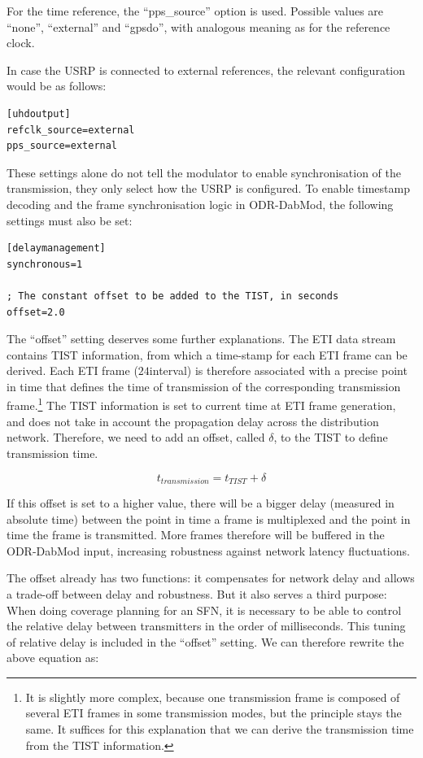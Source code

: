 For the time reference, the ``pps\_source'' option is used. Possible values are
``none'', ``external'' and ``gpsdo'', with analogous meaning as for the
reference clock.

In case the USRP is connected to external references, the relevant configuration
would be as follows:

\begin{lstlisting}
[uhdoutput]
refclk_source=external
pps_source=external
\end{lstlisting}

These settings alone do not tell the modulator to enable synchronisation of the
transmission, they only select how the USRP is configured. To enable timestamp
decoding and the frame synchronisation logic in ODR-DabMod, the following
settings must also be set:

\begin{lstlisting}
[delaymanagement]
synchronous=1

; The constant offset to be added to the TIST, in seconds
offset=2.0
\end{lstlisting}

The ``offset'' setting deserves some further explanations. The ETI data stream
contains TIST information, from which a time-stamp for each ETI frame can be
derived. Each ETI frame ($24$\ms interval) is therefore associated with a
precise point in time that defines the time of transmission of the corresponding
transmission frame.\footnote{It is slightly more complex, because one
    transmission frame is composed of several ETI frames in some
    transmission modes, but the principle stays the same. It suffices for this
    explanation that we can derive the transmission time from the TIST
information.} The TIST information is set to current time at ETI frame
generation, and does not take in account the propagation delay across the
distribution network. Therefore, we need to add an offset, called $\delta$, to
the TIST to define transmission time.

\[
t_{transmission} = t_{TIST} + \delta
\]

If this offset is set to a higher value, there will be a bigger delay (measured
in absolute time) between the point in time a frame is multiplexed and the point
in time the frame is transmitted. More frames therefore will be buffered in
the ODR-DabMod input, increasing robustness against network latency
fluctuations.

The offset already has two functions: it compensates for network delay and
allows a trade-off between delay and robustness. But it also serves a third
purpose: When doing coverage planning for an SFN, it is necessary to be able to
control the relative delay between transmitters in the order of milliseconds.
This tuning of relative delay is included in the ``offset'' setting. We can
therefore rewrite the above equation as:

